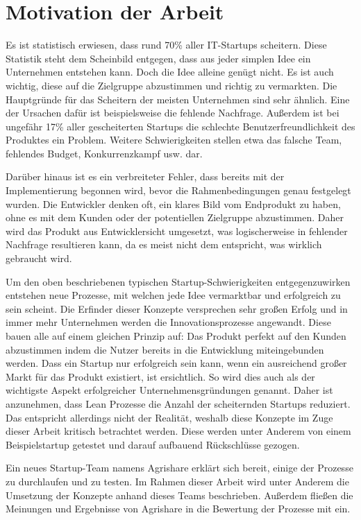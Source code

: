 \section{Motivation der Arbeit}
Es ist statistisch erwiesen, dass rund 70\% aller IT-Startups scheitern. \cite{CBInsights_failure} Diese Statistik steht dem Scheinbild entgegen, dass aus jeder simplen Idee ein Unternehmen entstehen kann. Doch die Idee alleine genügt nicht. Es ist auch wichtig, diese auf die Zielgruppe abzustimmen und richtig zu vermarkten. Die Hauptgründe für das Scheitern der meisten Unternehmen sind sehr ähnlich. Eine der Ursachen dafür ist beispielsweise die fehlende Nachfrage. Außerdem ist bei ungefähr 17\% aller gescheiterten Startups die schlechte Benutzerfreundlichkeit des Produktes ein Problem. Weitere Schwierigkeiten stellen etwa das falsche Team, fehlendes Budget, Konkurrenzkampf usw. dar. \cite{CBInsights_reasons}

Darüber hinaus ist es ein verbreiteter Fehler, dass bereits mit der Implementierung begonnen wird, bevor die Rahmenbedingungen genau festgelegt wurden. Die Entwickler denken oft, ein klares Bild vom Endprodukt zu haben, ohne es mit dem Kunden oder der potentiellen Zielgruppe abzustimmen. Daher wird das Produkt aus Entwicklersicht umgesetzt, was logischerweise in fehlender Nachfrage resultieren kann, da es meist nicht dem entspricht, was wirklich gebraucht wird.

Um den oben beschriebenen typischen Startup-Schwierigkeiten entgegenzuwirken entstehen neue Prozesse, mit welchen jede Idee vermarktbar und erfolgreich zu sein scheint. Die Erfinder dieser Konzepte versprechen sehr großen Erfolg und in immer mehr Unternehmen werden die Innovationsprozesse angewandt. Diese bauen alle auf einem gleichen Prinzip auf: Das Produkt perfekt auf den Kunden abzustimmen indem die Nutzer bereits in die Entwicklung miteingebunden werden. Dass ein Startup nur erfolgreich sein kann, wenn ein ausreichend großer Markt für das Produkt existiert, ist ersichtlich. So wird dies auch als der wichtigste Aspekt erfolgreicher Unternehmensgründungen genannt. Daher ist anzunehmen, dass Lean Prozesse die Anzahl der scheiternden Startups reduziert. Das entspricht allerdings nicht der Realität, weshalb diese Konzepte im Zuge dieser Arbeit kritisch betrachtet werden.\cite{patel201590} Diese werden unter Anderem von einem Beispielstartup getestet und darauf aufbauend Rückschlüsse gezogen.

Ein neues Startup-Team namens Agrishare erklärt sich bereit, einige der Prozesse zu durchlaufen und zu testen. Im Rahmen dieser Arbeit wird unter Anderem die Umsetzung der Konzepte anhand dieses Teams beschrieben. Außerdem fließen die Meinungen und Ergebnisse von Agrishare in die Bewertung der Prozesse mit ein.

